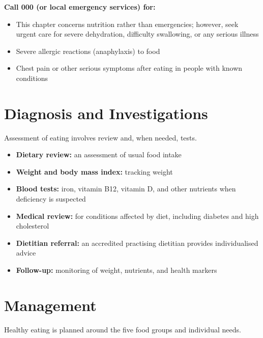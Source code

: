 \textbf{Call 000 (or local emergency services) for:}
\begin{itemize}
    \item This chapter concerns nutrition rather than emergencies; however, seek urgent care for severe dehydration, difficulty swallowing, or any serious illness
    \item Severe allergic reactions (anaphylaxis) to food
    \item Chest pain or other serious symptoms after eating in people with known conditions
\end{itemize}

\section*{Diagnosis and Investigations}
Assessment of eating involves review and, when needed, tests.

\begin{itemize}
    \item \textbf{Dietary review:} an assessment of usual food intake
    \item \textbf{Weight and body mass index:} tracking weight
    \item \textbf{Blood tests:} iron, vitamin B12, vitamin D, and other nutrients when deficiency is suspected
    \item \textbf{Medical review:} for conditions affected by diet, including diabetes and high cholesterol
    \item \textbf{Dietitian referral:} an accredited practising dietitian provides individualised advice
    \item \textbf{Follow-up:} monitoring of weight, nutrients, and health markers
\end{itemize}

\section*{Management}
Healthy eating is planned around the five food groups and individual needs.

